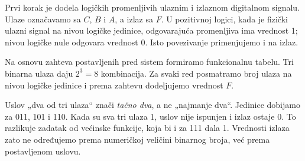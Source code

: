 Prvi korak je dodela logičkih promenljivih ulaznim i izlaznom digitalnom signalu. Ulaze označavamo sa \(C\), \(B\) i \(A\), a izlaz sa \(F\). U pozitivnoj logici, kada je fizički ulazni signal na nivou logičke jedinice, odgovarajuća promenljiva ima vrednost 1; nivou logičke nule odgovara vrednost 0. Isto povezivanje primenjujemo i na izlaz.

Na osnovu zahteva postavljenih pred sistem formiramo funkcionalnu tabelu. Tri binarna ulaza daju \(2^3=8\) kombinacija. Za svaki red posmatramo broj ulaza na nivou logičke jedinice i prema zahtevu dodeljujemo vrednost \(F\).

Uslov „dva od tri ulaza“ znači \emph{tačno dva}, a ne „najmanje dva“. Jedinice dobijamo za 011, 101 i 110. Kada su sva tri ulaza 1, uslov nije ispunjen i izlaz ostaje 0. To razlikuje zadatak od većinske funkcije, koja bi i za 111 dala 1. Vrednosti izlaza zato ne određujemo prema numeričkoj veličini binarnog broja, već prema postavljenom uslovu.
